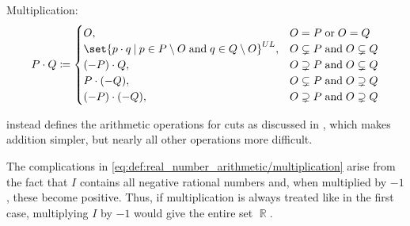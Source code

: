\begin{definition}
\begin{thmenum}
     Multiplication:
    \begin{equation}\label{eq:def:real_number_arithmetic/multiplication}
      P \cdot Q \coloneqq \begin{cases}
        O,                                                                             &O = P \T{or} O = Q \\
        \set{ p \cdot q \given p \in P \setminus O \T{and} q \in Q \setminus O }^{UL}, &O \subsetneq P \T{and} O \subsetneq Q \\
        (-P) \cdot Q,                                                                  &O \supsetneq P \T{and} O \subsetneq Q \\
        P \cdot (-Q),                                                                  &O \subsetneq P \T{and} O \supsetneq Q \\
        (-P) \cdot (-Q),                                                               &O \supsetneq P \T{and} O \supsetneq Q \\
      \end{cases}
    \end{equation}
  \end{thmenum}
\end{definition}
\begin{comments}
  \item {} instead defines the arithmetic operations for cuts as discussed in , which makes addition simpler, but nearly all other operations more difficult.
  \item The complications in \eqref{eq:def:real_number_arithmetic/multiplication} arise from the fact that \( I \) contains all negative rational numbers and, when multiplied by \( -1 \), these become positive. Thus, if multiplication is always treated like in the first case, multiplying \( I \) by \( -1 \) would give the entire set \( \BbbR \).
\end{comments}

